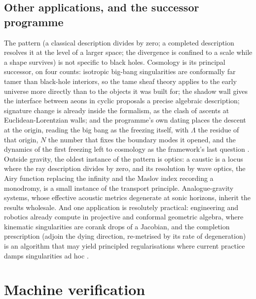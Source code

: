 \documentclass[11pt]{article}
\theoremstyle{definition}
\theoremstyle{plain}
\begin{document}
\subsection*{Other applications, and the successor programme}
\label{c:note.programme.setting-other-applications-successor-programme}
The pattern (a classical description divides by zero; a completed description resolves it at the level of a larger space; the divergence is confined to a scale while a shape survives) is not specific to black holes. Cosmology is its principal successor, on four counts: isotropic big-bang singularities are conformally far tamer than black-hole interiors, so the tame sheaf theory applies to the early universe more directly than to the objects it was built for; the shadow wall gives the interface between aeons in cyclic proposals a precise algebraic description; signature change is already inside the formalism, as the clash of ascents at Euclidean-Lorentzian walls; and the programme's own dating places the descent at the origin, reading the big bang as the freezing itself, with $\Lambda$ the residue of that origin, $N$ the number that fixes the boundary modes it opened, and the dynamics of the first freezing left to cosmology as the framework's last question \cite{ButlerT12, ButlerT14}. Outside gravity, the oldest instance of the pattern is optics: a caustic is a locus where the ray description divides by zero, and its resolution by wave optics, the Airy function replacing the infinity and the Maslov index recording a monodromy, is a small instance of the transport principle. Analogue-gravity systems, whose effective acoustic metrics degenerate at sonic horizons, inherit the results wholesale. And one application is resolutely practical: engineering and robotics already compute in projective and conformal geometric algebra, where kinematic singularities are corank drops of a Jacobian, and the completion prescription (adjoin the dying direction, re-metrised by its rate of degeneration) is an algorithm that may yield principled regularisations where current practice damps singularities ad hoc \cite{ButlerT2}.

\section{Machine verification}
\end{document}
